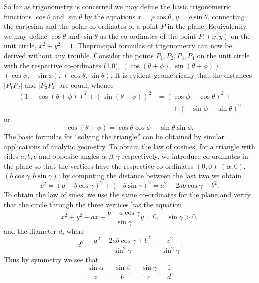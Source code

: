 So far as trigonometry is concerned we may define the basic
trigonometric functions $\cos \theta$ and $\sin \theta$ by the
equations $x = \rho \cos \theta$, $y = \rho \sin \theta$, connecting
the cartesian and the polar co-ordinates of a point $P$ in the
plane. Equivalently, we may define $\cos \theta$ and $\sin \theta$ as
the co-ordinates of the point $P : (x,y)$ on the unit circle, $x^2 +
y^2 = 1$. The\pageoriginale principal formulas of trigonometry can now
be derived without any trouble. Consider the points $P_1, P_2, P_3,
P_4$ on the unit circle with the respective co-ordinates (1,0), $(\cos
(\theta + \phi), \sin (\theta + \phi))$, $(\cos \phi, - \sin \phi)$,
$(\cos \theta, \sin \theta)$. It is evident geometrically that the
distances $|P_1 P_2|$ and $|P_3 P_4|$ are equal, whence
\begin{align*}
(1- \cos (\theta + \phi))^2 + (\sin (\theta + \phi))^2 & = (\cos \phi
  - \cos \theta)^2 + \\
& \qquad + (-\sin \phi - \sin \theta)^2
\end{align*}
or
$$
\cos (\theta + \phi) = \cos \theta \cos \phi - \sin \theta \sin \phi.
$$
The basic formulas for ``solving the triangle'' can be obtained by
similar applications of analytic geometry. To obtain the law of
cosines, for a triangle with sides $a, b, c$ and opposite angles
$\alpha, \beta, \gamma$ respectively, we introduce co-ordinates in the
plane so that  the vertices have the respective co-ordinates $(0,0)$
$(\alpha, 0)$, $(b \cos \gamma, b \sin \gamma)$; by computing the
distance between the last two we obtain
$$
c^2 = (a - b \cos \gamma)^2 +(-b \sin \gamma)^2 = a^2 - 2 ab \cos
\gamma + b^2.
$$
To obtain the law of sines, we use the same co-ordinates for the plane
and verify that the circle through the three vertices has the equation
$$
x^2 + y^2 - ax - \frac{b - a \cos \gamma}{\sin \gamma} y = 0, \quad
\sin \gamma > 0,
$$
and the diameter $d$, where
$$
d^2 = \frac{a^2 - 2 ab \cos \gamma + b^2}{\sin^2 \gamma} =
\frac{c^2}{\sin^2 \gamma}.
$$
Thus by symmetry we see that
$$
\frac{\sin \alpha}{a} = \frac{\sin \beta}{b} = \frac{\sin \gamma}{c} = \frac{1}{d}.
$$

